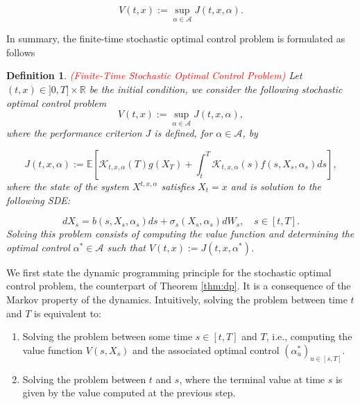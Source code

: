\documentclass{article}
\newtheorem{definition}{Definition}
\begin{document}
\begin{equation*} 
V(t,x):=\sup_{\alpha\in\mathcal{A}}J(t,x,\alpha).
\end{equation*}

In summary, the finite-time stochastic optimal control problem is formulated as follows

\begin{definition} \textcolor{red}{(Finite-Time Stochastic Optimal Control Problem)}
Let $(t,x)\in]0,T]\times\mathbb{R}$ be the initial condition, we consider the following stochastic optimal control problem
\begin{equation} \label{soc:value_fcn}
V(t,x):=\sup_{\alpha\in\mathcal{A}}J(t,x,\alpha),
\end{equation}
where the performance criterion $J$ is defined, for $\alpha\in\mathcal{A}$, by

\begin{equation} \label{soc:cost_fcn}
J(t,x,\alpha):=\mathbb{E}\left[\mathcal{K}_{t,x,\alpha}(T)g(X_T)+\int^T_t\mathcal{K}_{t,x,\alpha}(s)f(s,X_s,\alpha_s)ds\right],
\end{equation}
where the state of the system $X^{t,x,\alpha}$ satisfies $X_t=x$ and is solution to the following SDE:

\begin{equation} \label{sde_control}
dX_s = b(s,X_s,\alpha_s)ds + \sigma_s(X_s,\alpha_s)dW_s, \quad s\in[t,T].
\end{equation}
Solving this problem consists of computing the value function and determining the optimal control $\alpha^*\in\mathcal{A}$ such that $V(t,x):=J(t,x,\alpha^*)$. 
\end{definition}

We first state the dynamic programming principle for the stochastic optimal control problem, the counterpart of Theorem \ref{thm:dp}. It is a consequence of the Markov property of the dynamics. Intuitively, solving the problem between time $t$ and $T$ is equivalent to:

\begin{enumerate}
\item
Solving the problem between some time $s\in[t,T]$ and $T$, i.e., computing the value function $V(s,X_s)$ and the associated optimal control $(\alpha^*_u)_{u\in[s,T]}$.

\item
Solving the problem between $t$ and $s$, where the terminal value at time $s$ is given by the value computed at the previous step. 
\end{enumerate}
\end{document}
